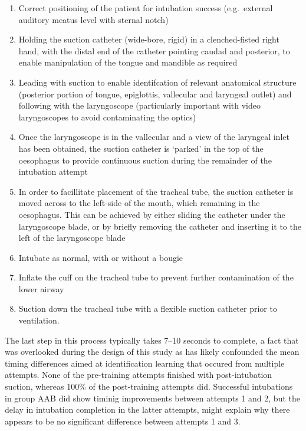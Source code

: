 \documentclass[]{article}
\providecommand{\tightlist}{%
  \setlength{\itemsep}{0pt}\setlength{\parskip}{0pt}}
\begin{document}
\begin{enumerate}
\def\labelenumi{\arabic{enumi}.}
\tightlist
\item
  Correct positioning of the patient for intubation success
  (e.g.~external auditory meatus level with sternal notch)
\item
  Holding the suction catheter (wide-bore, rigid) in a clenched-fisted
  right hand, with the distal end of the catheter pointing caudad and
  posterior, to enable manipulation of the tongue and mandible as
  required
\item
  Leading with suction to enable identifcation of relevant anatomical
  structure (posterior portion of tongue, epiglottis, vallecular and
  laryngeal outlet) and following with the laryngoscope (particularly
  important with video laryngoscopes to avoid contaminating the optics)
\item
  Once the laryngoscope is in the vallecular and a view of the laryngeal
  inlet has been obtained, the suction catheter is `parked' in the top
  of the oesophagus to provide continuous suction during the remainder
  of the intubation attempt
\item
  In order to facillitate placement of the tracheal tube, the suction
  catheter is moved across to the left-side of the mouth, which
  remaining in the oesophagus. This can be achieved by either sliding
  the catheter under the laryngoscope blade, or by briefly removing the
  catheter and inserting it to the left of the laryngoscope blade
\item
  Intubate as normal, with or without a bougie
\item
  Inflate the cuff on the tracheal tube to prevent further contamination
  of the lower airway
\item
  Suction down the tracheal tube with a flexible suction catheter prior
  to ventilation.
\end{enumerate}

The last step in this process typically takes 7--10 seconds to complete,
a fact that was overlooked during the design of this study as has likely
confounded the mean timing differences aimed at identification learning
that occured from multiple attempts. None of the pre-training attempts
finished with post-intubation suction, whereas 100\% of the
post-training attempts did. Successful intubations in group AAB did show
timinig improvements between attempts 1 and 2, but the delay in
intubation completion in the latter attempts, might explain why there
appears to be no significant difference between attempts 1 and 3.
\end{document}
